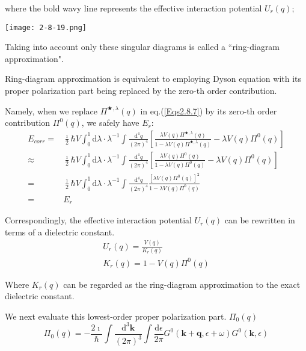 where the bold wavy line represents the effective interaction potential $U_r(q)$;
\begin{center} \label{Fig2.8.19}
\texttt{[image: 2-8-19.png]}
\end{center}

Taking into account only these singular diagrams is called a ``ring-diagram approximation".

Ring-diagram approximation is equivalent to employing Dyson equation with its proper polarization part being replaced by the zero-th order contribution.

Namely, when we replace $\Pi^{\bigstar,\lambda}(q)$ in eq.(\ref{Eqs2.8.7}) by its zero-th order contribution $\Pi^0(q)$, we safely have $E_r$:
\begin{equation*} \begin{split}
E_{corr} =&\frac{\imath}{2} \hbar V \int_0^1 \mathrm{d}\lambda \cdot \lambda^{-1} \int \frac{\mathrm{d}^4 q}{(2\pi)^4} \left[ \frac{\lambda V(q) \Pi^{\bigstar,\lambda}(q)}{1- \lambda V(q) \Pi^{\bigstar,\lambda}(q)} - \lambda V(q)\Pi^0(q) \right]\\
\approx& \frac{\imath}{2} \hbar V \int_0^1 \mathrm{d}\lambda \cdot \lambda^{-1} \int \frac{\mathrm{d}^4 q}{(2\pi)^4} \left[ \frac{\lambda V(q) \Pi^0(q)}{1- \lambda V(q) \Pi^0(q)} - \lambda V(q)\Pi^0(q) \right]\\
=& \frac{\imath}{2} \hbar V \int_0^1 \mathrm{d}\lambda \cdot \lambda^{-1} \int \frac{\mathrm{d}^4 q}{(2\pi)^4} \frac{[\lambda V(q) \Pi^0(q)]^2}{1- \lambda V(q) \Pi^0(q)}\\
=& E_r 
\end{split}\end{equation*}

Correspondingly, the effective interaction potential $U_r(q)$ can be rewritten in terms of a dielectric constant.
\begin{eqnarray}
U_r(q) = \frac{V(q)}{K_r(q)} \label{Eqs2.8.10}\\
K_r(q) = 1-V(q) \Pi^0(q) \label{Eqs2.8.11}
\end{eqnarray}

Where $K_r(q)$ can be regarded as the ring-diagram approximation to the exact dielectric constant.

We next evaluate this lowest-order proper polarization part. $\Pi_0(q)$
\begin{equation} \label{Eqs2.8.12}
\Pi_0(q) = - \frac{2\imath}{\hbar} \int \frac{\mathrm{d}^3 \mathbf{k}}{(2\pi)^3} \int \frac{\mathrm{d} \epsilon}{2\pi} G^0(\mathbf{k}+\mathbf{q},\epsilon+\omega) G^0(\mathbf{k},\epsilon)
\end{equation}

